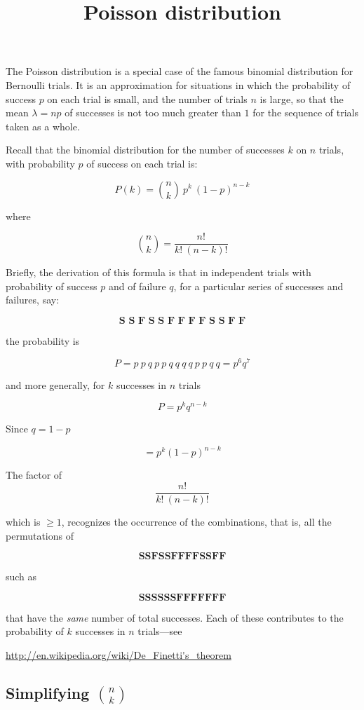 \documentclass[11pt, oneside]{article}
\title{Poisson distribution}
\date{}
\begin{document}
\maketitle
\Large


The Poisson distribution is a special case of the famous binomial distribution for Bernoulli trials.  It is an approximation for situations in which the probability of success $p$ on each trial is small, and the number of trials $n$ is large, so that the mean $\lambda = np$ of successes is not too much greater than $1$ for the sequence of trials taken as a whole.

Recall that the binomial distribution for the number of successes $k$ on $n$ trials, with probability $p$ of success on each trial is:

\[ P(k) = {n\choose k} \  p^k \  (1-p)^{n-k} \]

where

\[ {n\choose k} =  \frac{n!}{k!  \ (n-k)!}  \]

Briefly, the derivation of this formula is that in independent trials with probability of success $p$ and of failure $q$, for a particular series of successes and failures, say:

\[ \textbf{S\ S\ F\ S\ S\ F\ F\ F\ F\ S\ S\ F\ F} \]

the probability is

\[ P = p \ p \ q \ p \ p \ q \ q \ q \ q \ p \ p \ q \ q = p^6 q^7 \]

and more generally, for $k$ successes in $n$ trials

\[ P = p^k q^{n-k} \]

Since $q = 1-p$

\[ = p^k (1-p)^{n-k} \]

The factor of
\[ \frac{n!}{ k! \ (n-k)! } \] 

which is $\ge 1$, recognizes the occurrence of the combinations, that is, all the permutations of 

\[ \textbf{SSFSSFFFFSSFF} \]

such as 

\[ \textbf{SSSSSSFFFFFFF} \]

 that have the \emph{same} number of total successes.  Each of these contributes to the probability of $k$ successes in $n$ trials---see
 
\url{http://en.wikipedia.org/wiki/De_Finetti's_theorem}

\subsection*{Simplifying ${n\choose k}$}
\end{document}
